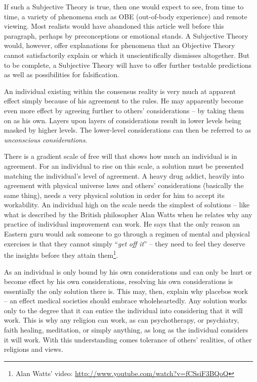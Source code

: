 \documentclass[11pt]{article}
\begin{document}
If such a Subjective Theory is true, then one would expect to see, from time to
time, a variety of phenomena such as OBE (out-of-body experience) and remote
viewing. Most realists would have abandoned this article well before this
paragraph, perhaps by preconceptions or emotional stands. A Subjective Theory
would, however, offer explanations for phenomena that an Objective Theory cannot
satisfactorily explain or which it unscientifically dismisses altogether. But to
be complete, a Subjective Theory will have to offer further testable predictions
as well as possibilities for falsification.

An individual existing within the consensus reality is very much at apparent
effect simply because of his agreement to the rules. He may apparently become
even more effect by agreeing further to others' considerations -- by taking them
on as his own. Layers upon layers of considerations result in lower levels being
masked by higher levels. The lower-level considerations can then be referred to
as {\em unconscious considerations}.

There is a gradient scale of free will that shows how much an individual is in
agreement. For an individual to rise on this scale, a solution must be presented
matching the individual's level of agreement. A heavy drug addict, heavily into
agreement with physical universe laws and others' considerations (basically the
same thing), needs a very physical solution in order for him to accept its
workability.  An individual high on the scale needs the simplest of solutions
-- like what is described by the British philosopher Alan Watts when he
relates why any practice of individual improvement can work. He says that the
only reason an Eastern guru would ask someone to go through a regimen of mental
and physical exercises is that they cannot simply ``{\em get off it}'' -- they
need to feel they deserve the insights before they attain them\footnote{ Alan
Watts' video: \url{http://www.youtube.com/watch?v=fCSsiF3BQoQ}}.

As an individual is only bound by his own considerations and can only be hurt or
become effect by his own considerations, resolving his own considerations is
essentially the only solution there is. This may, then, explain why placebos
work -- an effect medical societies should embrace wholeheartedly. Any solution
works only to the degree that it can entice the individual into considering that
it will work.  This is why any religion can work, as can psychotherapy, or
psychiatry, faith healing, meditation, or simply anything, as long as the
individual considers it will work. With this understanding comes tolerance of
others' realities, of other religions and views. 
\end{document}
